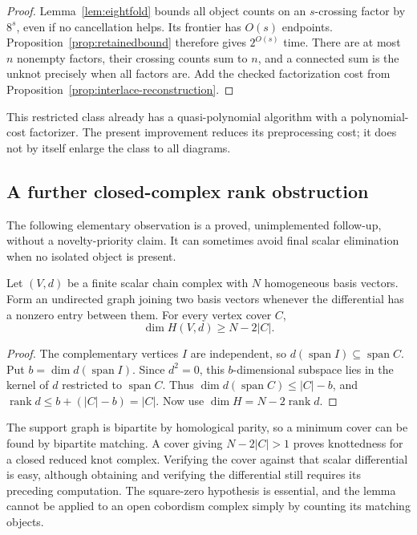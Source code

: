 \begin{proof}
Lemma~\ref{lem:eightfold} bounds all object counts on an $s$-crossing factor
by $8^s$, even if no cancellation helps.  Its frontier has $O(s)$ endpoints.
Proposition~\ref{prop:retainedbound} therefore gives $2^{O(s)}$ time.
There are at most $n$ nonempty factors, their crossing counts sum to $n$,
and a connected sum is the unknot precisely when all factors are.
Add the checked factorization cost from
Proposition~\ref{prop:interlace-reconstruction}.
\end{proof}

This restricted class already has a quasi-polynomial algorithm with a
polynomial-cost factorizer.  The present improvement reduces its
preprocessing cost; it does not by itself enlarge the class to all diagrams.

\subsection{A further closed-complex rank obstruction}

The following elementary observation is a proved, unimplemented follow-up,
without a novelty-priority claim.  It can sometimes avoid final scalar
elimination when no isolated object is present.

\begin{lemma}
\label{lem:vertexcoverbound}
Let $(V,d)$ be a finite scalar chain complex with $N$ homogeneous basis vectors.
Form an undirected graph joining two basis vectors whenever the differential
has a nonzero entry between them.  For every vertex cover $C$,
\[
 \dim H(V,d)\geq N-2|C|.
\]
\end{lemma}

\begin{proof}
The complementary vertices $I$ are independent, so
$d(\operatorname{span}I)\subseteq\operatorname{span}C$.
Put $b=\dim d(\operatorname{span}I)$.  Since $d^2=0$, this $b$-dimensional
subspace lies in the kernel of $d$ restricted to $\operatorname{span}C$.
Thus $\dim d(\operatorname{span}C)\leq|C|-b$, and
$\operatorname{rank}d\leq b+(|C|-b)=|C|$.
Now use $\dim H=N-2\operatorname{rank}d$.
\end{proof}

The support graph is bipartite by homological parity, so a minimum cover
can be found by bipartite matching.  A cover giving $N-2|C|>1$ proves
knottedness for a closed reduced knot complex.  Verifying the cover against
that scalar differential is easy, although obtaining and verifying the
differential still requires its preceding computation.  The square-zero
hypothesis is essential, and the lemma cannot be applied to an open
cobordism complex simply by counting its matching objects.
